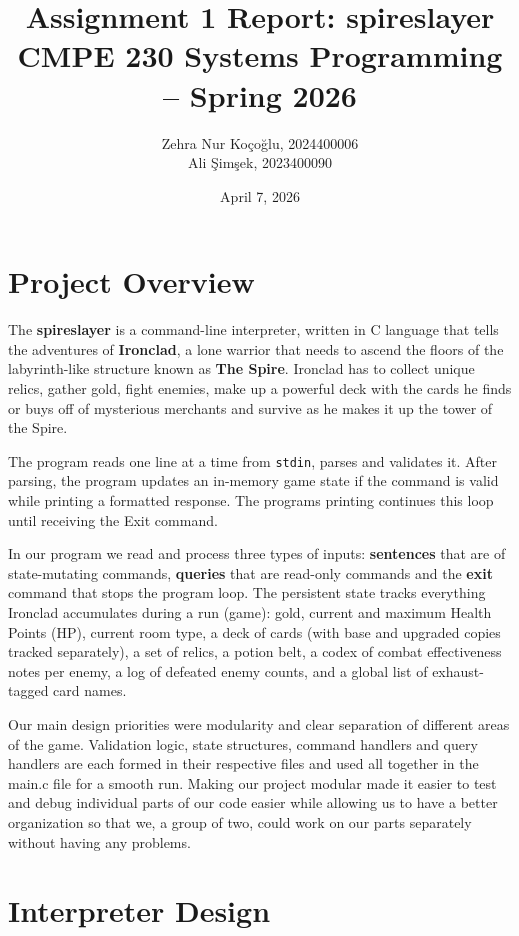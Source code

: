 \documentclass[12pt,a4paper]{article}
\title{\textbf{Assignment 1 Report: spireslayer}\\
\large CMPE 230 Systems Programming -- Spring 2026}
\author{Zehra Nur Koçoğlu, 2024400006\\Ali Şimşek, 2023400090}
\date{April 7, 2026}
\begin{document}
\maketitle

\section{Project Overview}

The \textbf{spireslayer} is a command-line interpreter, written in C language that tells the adventures of \textbf{Ironclad}, a lone warrior that needs to ascend the floors of the labyrinth-like structure known as \textbf{The Spire}. Ironclad has to collect unique relics, gather gold, fight enemies, make up a powerful deck with the cards he finds or buys off of mysterious merchants and survive as he makes it up the tower of the Spire.

The program reads one line at a time from \texttt{stdin}, parses and validates it. After parsing, the program updates an in-memory game state if the command is valid while printing a formatted response. The programs printing continues this loop until receiving the Exit command.

In our program we read and process three types of inputs: \textbf{sentences} that are of state-mutating commands, \textbf{queries} that are read-only commands and the \textbf{exit} command that stops the program loop. The persistent state tracks everything Ironclad accumulates during a run (game): gold, current and maximum Health Points (HP), current room type, a deck of cards (with base and upgraded copies tracked separately), a set of relics, a potion belt, a codex of combat effectiveness notes per enemy, a log of defeated enemy counts, and a global list of exhaust-tagged card names.

Our main design priorities were modularity and clear separation of different areas of the game. Validation logic, state structures, command handlers and query handlers are each formed in their respective files and used all together in the main.c file for a smooth run. Making our project modular made it easier to test and debug individual parts of our code easier while allowing us to have a better organization so that we, a group of two, could work on our parts separately without having any problems.

\section{Interpreter Design}
\end{document}
